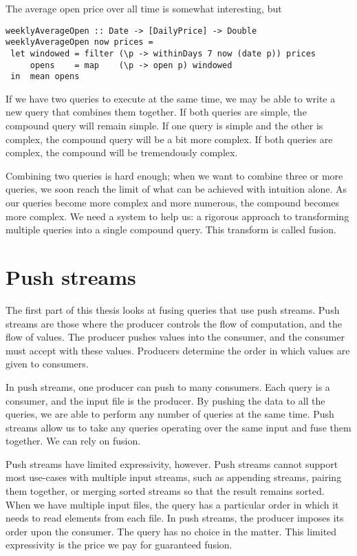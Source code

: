 The average open price over all time is somewhat interesting, but 

\begin{lstlisting}
weeklyAverageOpen :: Date -> [DailyPrice] -> Double
weeklyAverageOpen now prices =
 let windowed = filter (\p -> withinDays 7 now (date p)) prices
     opens    = map    (\p -> open p) windowed
 in  mean opens
\end{lstlisting}

If we have two queries to execute at the same time, we may be able to write a new query that combines them together.
If both queries are simple, the compound query will remain simple.
If one query is simple and the other is complex, the compound query will be a bit more complex.
If both queries are complex, the compound will be tremendously complex.

Combining two queries is hard enough; when we want to combine three or more queries, we soon reach the limit of what can be achieved with intuition alone.
As our queries become more complex and more numerous, the compound becomes more complex.
We need a system to help us: a rigorous approach to transforming multiple queries into a single compound query.
This transform is called fusion.

\section{Push streams}

The first part of this thesis looks at fusing queries that use push streams.
Push streams are those where the producer controls the flow of computation, and the flow of values.
The producer pushes values into the consumer, and the consumer must accept with these values.
Producers determine the order in which values are given to consumers.

In push streams, one producer can push to many consumers.
Each query is a consumer, and the input file is the producer.
By pushing the data to all the queries, we are able to perform any number of queries at the same time.
Push streams allow us to take any queries operating over the same input and fuse them together.
We can rely on fusion.

Push streams have limited expressivity, however.
Push streams cannot support most use-cases with multiple input streams, such as appending streams, pairing them together, or merging sorted streams so that the result remains sorted.
When we have multiple input files, the query has a particular order in which it needs to read elements from each file.
In push streams, the producer imposes its order upon the consumer.
The query has no choice in the matter.
This limited expressivity is the price we pay for guaranteed fusion.

